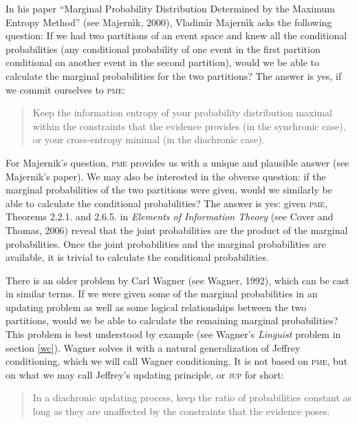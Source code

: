 \documentclass[entropy,article,submit,oneauthor,pdftex,12pt,a4paper]{mdpi}
\newcommand{\qeins}[1]{``#1''}
\newenvironment{quotex}{\begin{quote}\begin{footnotesize}}{\end{footnotesize}\end{quote}}
\begin{document}
In his paper \qeins{Marginal Probability Distribution Determined by
the Maximum Entropy Method} (see Majern{\'\i}k, 2000),
Vladim{\'\i}r Majern{\'\i}k asks the following question: If we had two
partitions of an event space and knew all the conditional
probabilities (any conditional probability of one event in the first
partition conditional on another event in the second partition), would
we be able to calculate the marginal probabilities for the two
partitions? The answer is yes, if we commit ourselves to
\textsc{pme}:

\begin{quotex}
  [\textsc{pme}] Keep the information entropy of your probability
  distribution maximal within the constraints that the evidence
  provides (in the synchronic case), or your cross-entropy minimal (in
  the diachronic case).
\end{quotex}

For Majernik's question, \textsc{pme} provides us with a unique and
plausible answer (see Majernik's paper). We may also be interested in
the obverse question: if the marginal probabilities of the two
partitions were given, would we similarly be able to calculate the
conditional probabilities? The answer is yes: given \textsc{pme},
Theorems 2.2.1. and 2.6.5. in \emph{Elements of Information Theory}
(see Cover and Thomas, 2006) reveal that the joint probabilities
are the product of the marginal probabilities. Once the joint
probabilities and the marginal probabilities are available, it is
trivial to calculate the conditional probabilities.

There is an older problem by Carl Wagner (see Wagner, 1992),
which can be cast in similar terms. If we were given some of the
marginal probabilities in an updating problem as well as some logical
relationships between the two partitions, would we be able to
calculate the remaining marginal probabilities? This problem is best
understood by example (see Wagner's \emph{Linguist} problem in section
\ref{wc}). Wagner solves it with a natural generalization of
Jeffrey conditioning, which we will call Wagner conditioning. It is
not based on \textsc{pme}, but on what we may call Jeffrey's
updating principle, or \textsc{jup} for short:

\begin{quotex}
  [\textsc{jup}] In a diachronic updating process, keep the ratio of
  probabilities constant as long as they are unaffected by the
  constraints that the evidence poses.
\end{quotex}
\end{document}
